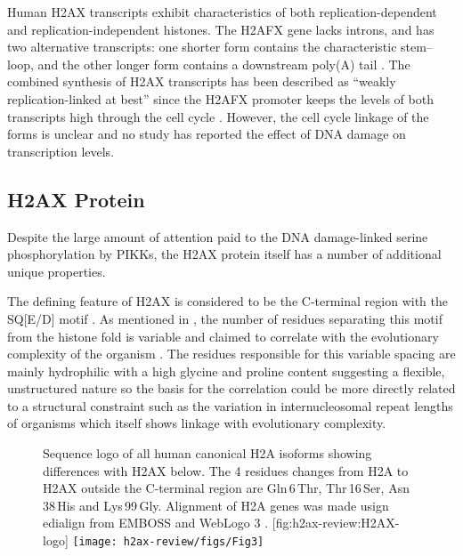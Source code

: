 Human H2AX transcripts exhibit characteristics of both
replication-dependent and replication-independent histones. The H2AFX
gene lacks introns, and has two alternative transcripts: one shorter
form contains the characteristic stem--loop, and the other longer form
contains a downstream poly(A) tail \citep{CMWMB89}
. The combined synthesis of H2AX
transcripts has been described as ``weakly replication-linked at
best'' since the H2AFX promoter keeps the levels of both transcripts
high through the cell cycle \citep{VSI94}. However, the cell cycle
linkage of the forms is unclear and no study has reported the effect
of DNA damage on transcription levels.

\subsection{H2AX Protein}
\label{subsec:h2ax-review:H2AX-protein}
Despite the large amount of attention paid to the DNA damage-linked
serine phosphorylation by PIKKs, the H2AX protein itself has a number
of additional unique properties.

The defining feature of H2AX is considered to be the C-terminal
region with the SQ[E/D]\textPhi{} motif
. As mentioned in
, the number of residues
separating this motif from the histone fold is variable and claimed to
correlate with the evolutionary complexity of the organism
\citep{CRDP+02}. The residues responsible for this variable spacing
are mainly hydrophilic with a high glycine and proline content
suggesting a flexible, unstructured nature so the basis for the
correlation could be more directly related to a structural constraint
such as the variation in internucleosomal repeat lengths of organisms
which itself shows linkage with evolutionary complexity.

\begin{figure}
\begin{sidecaption}%
                   {Sequence logo of all human canonical H2A isoforms
                     showing differences with H2AX below. The 4
                     residues changes from H2A to H2AX outside the
                     C-terminal region are Gln\,6\,Thr, Thr\,16\,Ser,
                     Asn\,38\,His and Lys\,99\,Gly. Alignment of H2A
                     genes was made usign edialign
                     \citep{Mor99} from EMBOSS
                     \citep{RLB00} and WebLogo 3
                     \citep{CHC+04}.}%
                   [fig:h2ax-review:H2AX-logo]
\centering
\texttt{[image: h2ax-review/figs/Fig3]}
\end{sidecaption}
\end{figure}

